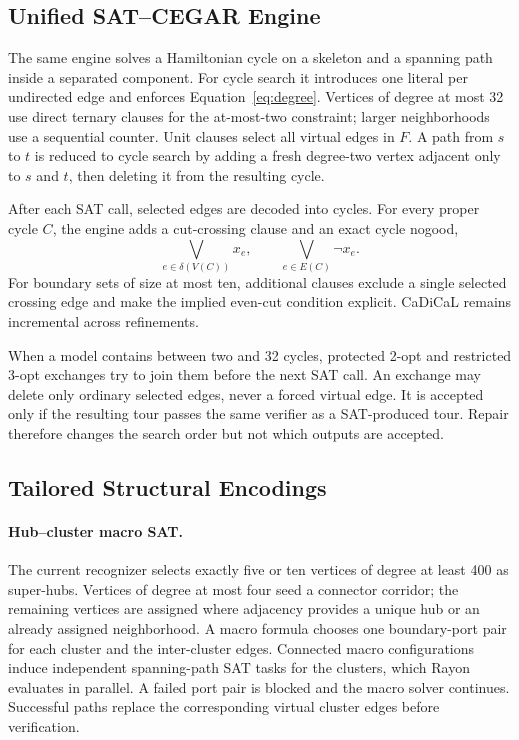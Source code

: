 \documentclass[sigconf,anonymous]{aamas}
\begin{document}
\subsection{Unified SAT--CEGAR Engine}
\label{sec:engine}

The same engine solves a Hamiltonian cycle on a skeleton and a spanning
path inside a separated component. For cycle search it introduces one
literal per undirected edge and enforces
Equation~\eqref{eq:degree}. Vertices of degree at most 32 use direct
ternary clauses for the at-most-two constraint; larger neighborhoods use
a sequential counter. Unit clauses select all virtual edges in $F$.
A path from $s$ to $t$ is reduced to cycle search by adding a fresh
degree-two vertex adjacent only to $s$ and $t$, then deleting it from
the resulting cycle.

After each SAT call, selected edges are decoded into cycles. For every
proper cycle $C$, the engine adds a cut-crossing clause and an exact
cycle nogood,
\begin{equation}
 \bigvee_{e\in\delta(V(C))}x_e,
 \qquad
 \bigvee_{e\in E(C)}\neg x_e.
 \label{eq:refinement}
\end{equation}
For boundary sets of size at most ten, additional clauses exclude a
single selected crossing edge and make the implied even-cut condition
explicit. CaDiCaL remains incremental across refinements.

When a model contains between two and 32 cycles, protected 2-opt and
restricted 3-opt exchanges try to join them before the next SAT call.
An exchange may delete only ordinary selected edges, never a forced
virtual edge. It is accepted only if the resulting tour passes the same
verifier as a SAT-produced tour. Repair therefore changes the search
order but not which outputs are accepted.

\subsection{Tailored Structural Encodings}
\label{sec:frontends}

\paragraph{Hub--cluster macro SAT.}
The current recognizer selects exactly five or ten vertices of degree at
least 400 as super-hubs. Vertices of degree at most four seed a connector
corridor; the remaining vertices are assigned where adjacency provides a
unique hub or an already assigned neighborhood.
A macro formula chooses one boundary-port pair for each cluster and the
inter-cluster edges. Connected macro configurations induce independent
spanning-path SAT tasks for the clusters, which Rayon evaluates in
parallel. A failed port pair is blocked and the macro solver continues.
Successful paths replace the corresponding virtual cluster edges before
verification.
\end{document}
